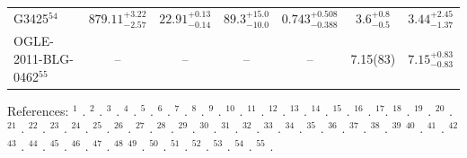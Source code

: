 \begin{table}[h]
\begin{threeparttable}
{\begin{tabular}{|l c c c c c c|}
G3425$^{54}$ & $879.11^{+3.22}_{-2.57}$ & $22.91^{+0.13}_{-0.14}$ & $89.3^{+15.0}_{-10.0}$& $0.743^{+0.508}_{-0.388}$ & $3.6^{+0.8}_{-0.5}$ & $3.44_{-1.37}^{+2.45}$\\ 
OGLE-2011-BLG-0462$^{55}$ & -- & -- & --  &--& 7.15(83) & $7.15_{-0.83}^{+0.83}$\\  \hline
\end{tabular}}
\begin{tablenotes}[flushleft]
\small
\item {\footnotesize References: 
$^1$ \citet{orosz2003}. 
$^2$ \citet{greiner2001}.
$^3$ \citet{casares2009}.
$^4$ \citet{Farr2011}.
$^5$ \citet{galaxiesBHs2023deSa}.
$^6$ \citet{wu2015}.
$^7$ \citet{wu2016}.
$^8$ \citet{gonzalez2013}.
$^9$ \citet{ioannou2004}.
$^{10}$ \citet{torres2021}.
$^{11}$ \citet{matasanchez2021}.
$^{12}$ \citet{casares1994}.
$^{13}$ \citet{khargharia2010}.
$^{14}$ \citet{orosz2004}.
$^{15}$ \citet{cherepashchuk2024band}.
$^{16}$ \citet{filippenko1995mass}. $^{17}$\citet{petrov2017masses}.
$^{18}$ \citet{remillard1996}.
$^{19}$ \citet{harlaftis1997}.
$^{20}$ \citet{petretti2023}.
$^{21}$ \citet{yanesrizo2022}.
$^{22}$ \citet{matasanchez2022}.
$^{23}$ \citet{torres2019}.
$^{24}$ \citet{torres2020}.
$^{25}$ \citet{orosz2011a}.
$^{26}$ \citet{heida2017}.
$^{27}$ \citet{filippenko1999}.
$^{28}$ \citet{orosz2001}.
$^{29}$ \citet{macdonald2014}.
$^{30}$ \citet{yanes2024evidence}.
$^{31}$ \citet{casares2022correlation}.
$^{32}$ \citet{sanchez2024}.
$^{33}$ \citet{casares2023orbital}.
$^{34}$ \citet{soria20222}.
$^{35}$ \citet{jana2021}.
$^{36}$ \citet{shang2019}.
$^{37}$ \citet{molla2017}.
$^{38}$ \citet{tsurnov2018}.
$^{39}$ \citet{new}
$^{40}$ \citet{orosz2009}.
$^{41}$ \citet{orosz2014}.
$^{42}$ \citet{ramachandran2022}
$^{43}$ \citet{binder2021}.
$^{44}$ \citet{crowther2010}.
$^{45}$ \citet{silverman2008}.
$^{46}$ \citet{t2019}.
$^{47}$ \citet{m2022}.
$^{48}$ \citet{peri2011}
$^{49}$ \citet{shenar2022}.
$^{50}$ \citet{ElBadry2022}.
$^{51}$ \citet{chakrabarti2023}.
$^{52}$ \citet{ElBadry2023}.
$^{53}$ \citet{panuzzo2024discovery}.
$^{54}$ \citet{wang2024}.
$^{55}$ \citet{sahu2025}.}

\end{tablenotes}
\end{threeparttable}
\end{table}